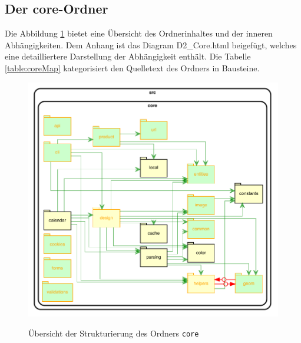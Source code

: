 \subsection{Der core-Ordner}
Die Abbildung \ref{fig:core-sturktur} bietet eine Übersicht des Ordnerinhaltes und der inneren Abhängigkeiten.
Dem Anhang ist das Diagram D2\_Core.html beigefügt, welches eine detailliertere Darstellung der Abhängigkeit enthält.
Die Tabelle \ref{table:coreMap} kategorisiert den Quelletext des Ordners in Bausteine.

\begin{figure}[H]
    \centering
    \caption{Übersicht der Strukturierung des Ordners \lstinline|core|}
    \includegraphics[width=.7\textwidth]{diagrams/Ist-Architektur/core-graph.pdf}
    \label{fig:core-sturktur}
\end{figure}

